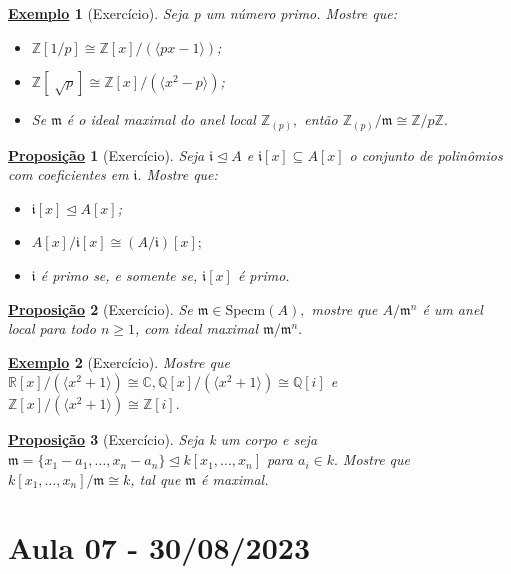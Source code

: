 \documentclass{article}
\newtheorem*{prop*}{\underline{Proposi\c c\~ao}}
\newtheorem{example}{\underline{Exemplo}}
\begin{document}
 \begin{example}[Exercício]
  Seja p um número primo. Mostre que:
 \begin{itemize}
  \item[1)] \(\mathbb{Z}[1/p]\cong \mathbb{Z}[x]/(\langle px-1 \rangle)\);
  \item[2)] \(\mathbb{Z}[\sqrt[]{p}]\cong \mathbb{Z}[x]/(\langle x^{2}-p \rangle)\);
  \item[3)] Se \(\mathfrak{m}\) é o ideal maximal do anel local \(\mathbb{Z}_{(p)},\) então \(\mathbb{Z}_{(p)}/\mathfrak{m}\cong{\mathbb{Z}/p \mathbb{Z}}.\)
 \end{itemize}
\end{example}
\begin{prop*}[Exercício]
  Seja \(\mathfrak{i}\trianglelefteq{A}\) e \(\mathfrak{i}[x]\subseteq A[x]\) o conjunto de polinômios 
com coeficientes em \(\mathfrak{i}.\) Mostre que:
 \begin{itemize}
  \item[1)] \(\mathfrak{i}[x] \trianglelefteq{A[x]}\);
  \item[2)] \(A[x]/\mathfrak{i}[x]\cong{(A/\mathfrak{i})}[x];\)
  \item[3)] \(\mathfrak{i}\) é primo se, e somente se, \(\mathfrak{i}[x]\) é primo.
 \end{itemize}
\end{prop*}
\begin{prop*}[Exercício]
  Se \(\mathfrak{m}\in \mathrm{Specm}(A),\) mostre que \(A/\mathfrak{m}^{n}\) é um anel local para todo
 \(n \geq 1\), com ideal maximal \(\mathfrak{m}/\mathfrak{m}^{n}.\)
\end{prop*}
\begin{example}[Exercício]
  Mostre que \(\mathbb{R}[x]/(\langle x^{2}+1 \rangle)\cong{\mathbb{C}}, \mathbb{Q}[x]/(\langle x^{2}+1 \rangle)\cong{\mathbb{Q}[i]}\)
e \(\mathbb{Z}[x]/(\langle x^{2}+1 \rangle)\cong{\mathbb{Z}[i]}.\)
\end{example}
\begin{prop*}[Exercício]
  Seja k um corpo e seja \(\mathfrak{m} = \{x_{1}-a_{1}, \dotsc, x_{n}-a_{n}\}\trianglelefteq{k[x_{1}, \dotsc, x_{n}]}\) para
 \(a_{i}\in k.\) Mostre que \(k[x_{1}, \dotsc, x_{n}]/\mathfrak{m}\cong{k}\), tal que \(\mathfrak{m}\) é maximal. 
\end{prop*}
\newpage

\section{Aula 07 - 30/08/2023}
\end{document}
